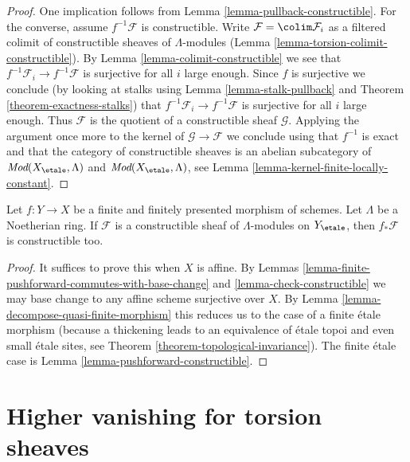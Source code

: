 \begin{proof}
One implication follows from Lemma \ref{lemma-pullback-constructible}.
For the converse, assume $f^{-1}\mathcal{F}$ is constructible.
Write $\mathcal{F} = \colim \mathcal{F}_i$ as a
filtered colimit of constructible sheaves of $\Lambda$-modules
(Lemma \ref{lemma-torsion-colimit-constructible}).
By Lemma \ref{lemma-colimit-constructible} we see that
$f^{-1}\mathcal{F}_i \to f^{-1}\mathcal{F}$
is surjective for all $i$ large enough. Since $f$ is surjective
we conclude (by looking at stalks using
Lemma \ref{lemma-stalk-pullback} and
Theorem \ref{theorem-exactness-stalks})
that $f^{-1}\mathcal{F}_i \to f^{-1}\mathcal{F}$
is surjective for all $i$ large enough.
Thus $\mathcal{F}$ is the quotient of a constructible sheaf $\mathcal{G}$.
Applying the argument once more to the kernel
of $\mathcal{G} \to \mathcal{F}$ we conclude using that $f^{-1}$ is exact
and that the category of constructible sheaves is an abelian
subcategory of $\textit{Mod}(X_\etale, \Lambda)$ and
$\textit{Mod}(X_\etale, \Lambda)$, see
Lemma \ref{lemma-kernel-finite-locally-constant}.
\end{proof}

\begin{lemma}
\label{lemma-finite-pushforward-constructible}
Let $f : Y \to X$ be a finite and finitely presented morphism
of schemes. Let $\Lambda$ be a Noetherian ring. If $\mathcal{F}$ is
a constructible sheaf of $\Lambda$-modules on $Y_\etale$,
then $f_*\mathcal{F}$ is constructible too.
\end{lemma}

\begin{proof}
It suffices to prove this when $X$ is affine.
By Lemmas \ref{lemma-finite-pushforward-commutes-with-base-change} and
\ref{lemma-check-constructible} we may base change to any
affine scheme surjective over $X$. By
Lemma \ref{lemma-decompose-quasi-finite-morphism}
this reduces us to the case of a finite \'etale morphism
(because a thickening leads to an equivalence of \'etale topoi
and even small \'etale sites, see
Theorem \ref{theorem-topological-invariance}).
The finite \'etale case is
Lemma \ref{lemma-pushforward-constructible}.
\end{proof}





\section{Higher vanishing for torsion sheaves}
\label{section-vanishing-torsion}

